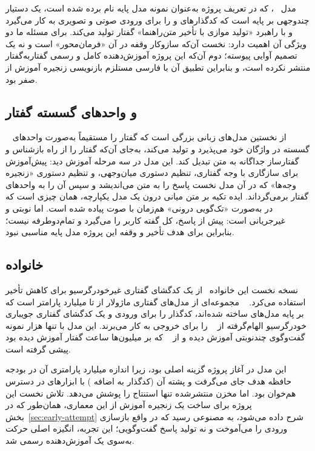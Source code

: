 مدل ~\cite{xie2024miniomni2}، که در تعریف پروژه به‌عنوان نمونه
مدل پایه نام برده شده است، یک دستیار چند‌وجهی بر پایه  است که
کدگذارهای  و  را برای ورودی صوتی و تصویری به کار
می‌گیرد و با راهبرد «تولید موازی با تأخیر متن‌راهنما» گفتار تولید می‌کند.
برای مسئله ما دو ویژگی آن اهمیت دارد: نخست آن‌که سازوکار وقفه در آن
«فرمان‌محور» است و نه یک تصمیم آوایی پیوسته؛ دوم آن‌که این پروژه
آموزش‌دهنده کامل و رسمی گفتار‌به‌گفتار منتشر نکرده است، و بنابراین تطبیق آن
با فارسی مستلزم بازنویسی زنجیره آموزش از صفر بود.

\subsection{ و واحدهای گسسته گفتار}

~\cite{zhang2023speechgpt} از نخستین مدل‌های زبانی بزرگی است که
گفتار را مستقیماً به‌صورت واحدهای گسسته در واژگان خود می‌پذیرد و تولید می‌کند،
به‌جای آن‌که گفتار را از راه بازشناس و گفتارساز جداگانه به متن تبدیل کند. این
مدل در سه مرحله آموزش دید: پیش‌آموزش برای سازگاری با وجه گفتاری، تنظیم
دستوری میان‌وجهی، و تنظیم دستوری «زنجیره وجه‌ها» که در آن مدل نخست پاسخ را به
متن می‌اندیشد و سپس آن را به واحدهای گفتار برمی‌گرداند. ایده تکیه بر متن
میانی درون یک مدل یکپارچه، همان چیزی است که در  به‌صورت «تک‌گویی
درونی» هم‌زمان با صوت پیاده شده است.  اما نوبتی و
غیرجریانی است: پیش از پاسخ، کل گفته کاربر را می‌گیرد و تمام‌دوطرفه نیست؛
بنابراین برای هدف تأخیر و وقفه این پروژه مدل پایه مناسبی نبود.

\subsection{خانواده }

نسخه نخست این خانواده~\cite{fang2025llamaomni} از یک کدگشای گفتاری
غیرخودرگرسیو برای کاهش تأخیر استفاده می‌کرد.
~\cite{fang2025llamaomni2} مجموعه‌ای از مدل‌های گفتاری ماژولار
از  تا  میلیارد پارامتر است که بر پایه مدل‌های
 ساخته شده‌اند، کدگذار  را برای ورودی و یک
کدگشای گفتاری جویباری خودرگرسیو الهام‌گرفته از
~\cite{du2024cosyvoice2} را برای خروجی به کار می‌برند. این
مدل با تنها  هزار نمونه گفت‌وگوی چند‌نوبتی آموزش دیده و از
~\cite{zeng2024glm4voice} که بر میلیون‌ها ساعت گفتار آموزش
دیده بود پیشی گرفته است.

این مدل در آغاز پروژه گزینه اصلی بود، زیرا اندازه  میلیارد
پارامتری آن در بودجه حافظه هدف جای می‌گرفت و پشته آن (کدگذار  به
اضافه ) با ابزارهای در دسترس هم‌خوان بود. اما مخزن منتشرشده
تنها استنتاج را پوشش می‌دهد. تلاش نخست این پروژه برای ساخت یک زنجیره آموزش
از این معماری، همان‌طور که در بخش~\ref{sec:early-attempt} شرح داده می‌شود، به
مصنوعی رسید که در واقع بازسازی ورودی را می‌آموخت و نه تولید پاسخ گفت‌وگویی؛
این تجربه، انگیزه اصلی حرکت به‌سوی یک آموزش‌دهنده رسمی شد.


